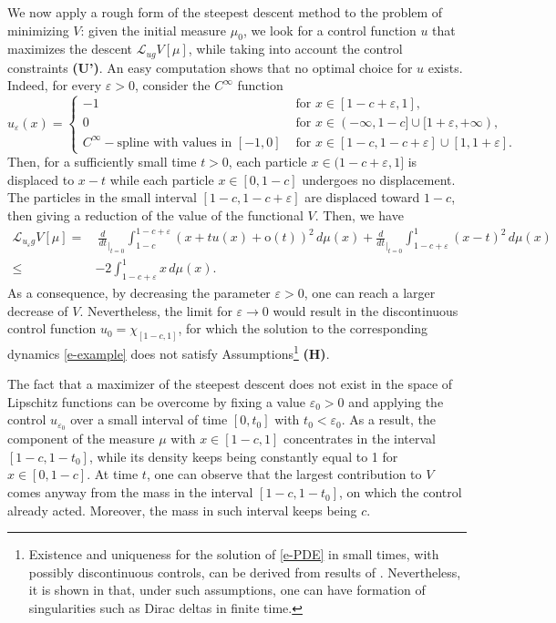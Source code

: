 \documentclass{article}
\renewcommand{\L}{\mathcal{L}}
\theoremstyle{definition}\newtheorem{remark}{Remark}
\newcommand{\eps}{\varepsilon}
\renewcommand{\r}[1]{\eqref{#1}}
\begin{document}
We now apply a rough form of the steepest descent method to the problem of minimizing $V$: given the initial measure $\mu_0$, we look for a control function $u$ that maximizes the descent $\L_{u g}V[\mu]$, while taking into account the control constraints {\bf (U')}. An easy computation shows that no optimal choice for $u$ exists. Indeed, for every $\eps>0$, consider the $C^\infty$ function 
$$
u_\eps(x)=
\begin{cases}
-1 & \mbox{ for } x\in [1-c+\eps,1],\\
0 & \mbox{ for } x\in (-\infty, 1-c]\cup [1+\eps,+\infty),\\
C^\infty-\mbox{spline with values in } [-1,0] & \mbox{ for } x\in [1-c,1-c+\eps] \cup [1,1+\eps].
\end{cases}
$$
Then, for a sufficiently small time $t>0$, each particle $x\in(1-c+\eps,1]$ is displaced to $x-t$ while each particle $x\in[0,1-c]$ undergoes no displacement. The particles in the small interval $[1-c,1-c+\eps]$ are displaced toward $1-c$, then giving a reduction of the value of the functional $V$. Then, we have 
\begin{align*}
 \L_{u_\eps g}V[\mu]= &\ 
 \frac{d}{dt}_{|_{t=0}} \int_{1-c}^{1-c+\eps}  (x+tu(x)+\mathrm{o}(t))^2 \, d\mu(x) +\frac{d}{dt}_{|_{t=0}} \int_{1-c+\eps}^1 (x-t)^2 \, d\mu(x) \\
 \leq &  -2 \int_{1-c+\eps}^1 x \, d\mu(x).
\end{align*}
As a consequence, by decreasing the parameter $\eps>0$, one can reach a larger decrease of $V$. Nevertheless, the limit for $\eps \to 0$ would result in the discontinuous control function $u_0=\chi_{[1-c,1]}$, for which the solution to the corresponding dynamics \r{e-example} does not satisfy Assumptions\footnote{Existence and uniqueness for the solution of \r{e-PDE} in small times, with possibly discontinuous controls, can be derived from results of \cite{ambrosio,paola}. Nevertheless, it is shown in \cite{paola} that, under such assumptions, one can have formation of singularities such as Dirac deltas in finite time.} {\bf (H)}.

The fact that a maximizer of the steepest descent does not exist in the space of Lipschitz functions can be  overcome by fixing a value $\eps_0>0$ and applying the control $u_{\eps_0}$ over a small interval of time $[0,t_0]$ with $t_0<\eps_0$. As a result, the component of the measure $\mu$ with $x\in [1-c,1]$ concentrates in the interval $[1-c,1-t_0]$, while its density keeps being constantly equal to 1 for $x\in [0,1-c]$. At time $t$, one can observe that the largest contribution to $V$ comes anyway from the mass in the interval $[1-c,1-t_0]$, on which the control already acted. Moreover, the mass in such interval keeps being $c$.
\end{document}
